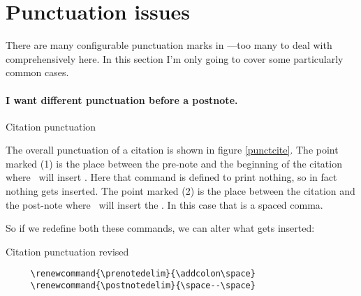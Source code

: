 \section{Punctuation issues}\label{sec:punctuation}

There are many configurable punctuation marks in \biblatex---too many
to deal with comprehensively here. In this section I'm only going to
cover some particularly common cases.

\paragraph{I want different punctuation before a postnote.}
\begin{marginfigure}[12ex]
\vspace{3pt}%
\caption{Citation punctuation}\label{punctcite}
\end{marginfigure}
The overall punctuation of a citation is shown in figure
\ref{punctcite}. The point marked (1) is the place between the
pre-note and the beginning of the citation where \biblatex\ will
insert . Here that command is defined to print
nothing, so in fact nothing gets inserted. The point marked (2) is the
place between the citation and the post-note where \biblatex\ will
insert the . In this case that is a spaced comma.

So if we redefine both these commands, we can alter what gets
inserted:\begin{marginfigure}[12ex]
 \vspace{3pt}%
\caption{Citation punctuation revised}\label{punctcite2}
\end{marginfigure}
\begin{Verbatim}
     \renewcommand{\prenotedelim}{\addcolon\space}
     \renewcommand{\postnotedelim}{\space--\space}
\end{Verbatim}


